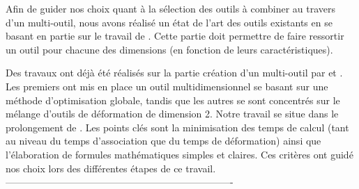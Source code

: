 Afin de guider nos choix quant à la sélection des outils à combiner au travers
d'un multi-outil, nous avons réalisé un état de l'art des outils existants en
se basant en partie sur le travail de \cite{GB08}. Cette partie doit permettre
de faire ressortir un outil pour chacune des dimensions (en fonction de leurs
caractéristiques).

Des travaux ont déjà été réalisés sur la partie création d'un multi-outil par
\cite{JBPS11} et \cite{GPCP13}. Les premiers ont mis en place un outil
multidimensionnel se basant sur une méthode d'optimisation globale, tandis que
les autres se sont concentrés sur le mélange d'outils de déformation de
dimension 2. Notre travail se situe dans le prolongement de \cite{GPCP13}. Les
points clés sont la minimisation des temps de calcul (tant au niveau du temps
d'association que du temps de déformation) ainsi que l'élaboration de formules
mathématiques simples et claires. Ces critères ont guidé nos choix lors des
différentes étapes de ce travail. %
----------------------------------------------------------------------
